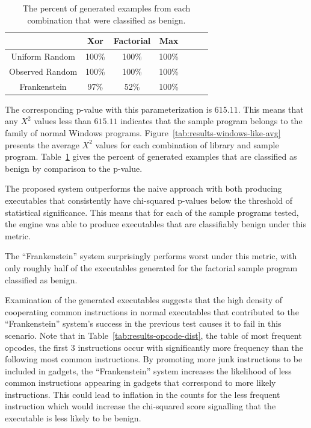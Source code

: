     \begin{table}
        \centering
        \begin{tabular}{|c||c|c|c|c|c|c|}
            \hline
                            & Xor & Factorial & Max \\
            \hline
            Uniform Random  & 100\% & 100\% & 100\%\\
            \hline
            Observed Random & 100\% & 100\% & 100\%\\
            \hline
            Frankenstein    & 97\% & 52\% & 100\% \\
            \hline
        \end{tabular}
        \caption{The percent of generated examples from each combination
            that were classified as benign.}
        \label{tab:results-windows-like-passed}
    \end{table}

    The corresponding p-value with this parameterization is $615.11$. This
    means that any $X^2$ values less than $615.11$ indicates that the sample
    program belongs to the family of normal Windows programs.
    Figure~\ref{tab:results-windows-like-avg} presents the average $X^2$
    values for each combination of library and sample program.
    Table~\ref{tab:results-windows-like-passed} gives the percent of
    generated examples that are classified as benign by comparison to the
    p-value.

    The proposed system outperforms the naive approach with both producing
    executables that consistently have chi-squared p-values below the threshold
    of statistical significance. This means that for each of the sample
    programs tested, the engine was able to produce executables that are
    classifiably benign under this metric.

    The ``Frankenstein'' system surprisingly performs worst under this metric,
    with only roughly half of the executables generated for the factorial sample
    program classified as benign.

    Examination of the generated executables suggests that the high density of
    cooperating common instructions in normal executables that contributed to
    the ``Frankenstein'' system's success in the previous test causes it to fail
    in this scenario. Note that in Table~\ref{tab:results-opcode-dist}, the
    table of most frequent opcodes, the first 3 instructions occur with
    significantly more frequency than the following most common instructions. By
    promoting more junk instructions to be included in gadgets, the
    ``Frankenstein'' system increases the likelihood of less common instructions
    appearing in gadgets that correspond to more likely instructions. This could
    lead to inflation in the counts for the less frequent instruction which
    would increase the chi-squared score signalling that the executable is less
    likely to be benign.


